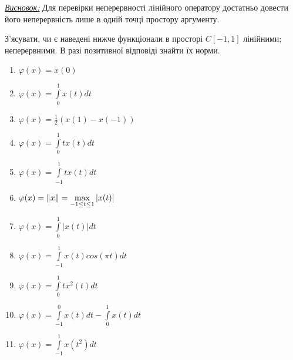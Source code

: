 \begin{theory}
    \underline{\emph{Висновок:}} Для перевірки неперервності лінійного оператору достатньо 
    довести його неперервність лише в одній точці простору аргументу.
\end{theory}

\begin{exercise}
    З'ясувати, чи є наведені нижче функціонали в просторі $C{\left[-1, 1\right]}$ лінійними; 
    неперервними. В разі позитивної відповіді знайти їх норми. 
    \begin{enumerate}[label=\ukr*)]
        \item $\varphi(x) = x(0)$
        \item $\varphi(x) = \int\limits_0^1x(t)dt$
        \item $\varphi(x) = \frac{1}{2}(x(1) - x(-1))$
        \item $\varphi(x) = \int\limits_0^1tx(t)dt$
        \item $\varphi(x) = \int\limits_{-1}^1tx(t)dt$
        \item $\varphi(x) = \left\lVert x\right\rVert = \max\limits_{-1 \leq t \leq 1} |x(t)|$
        \item $\varphi(x) = \int\limits_0^1|x(t)|dt$
        \item $\varphi(x) = \int\limits_{-1}^1x(t)cos(\pi t)dt$
        \item $\varphi(x) = \int\limits_0^1tx^2(t)dt$
        \item $\varphi(x) = \int\limits_{-1}^0x(t)dt - \int\limits_0^1x(t)dt$
        \item $\varphi(x) = \int\limits_{-1}^1x(t^2)dt$
    \end{enumerate}
\end{exercise}

